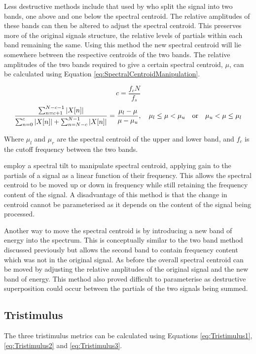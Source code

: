 		Less destructive methods include that used by \citet{zacharakis2011an} who split the signal into two bands,
		one above and one below the spectral centroid. The relative amplitudes of these bands can then be altered to
		adjust the spectral centroid. This preserves more of the original signals structure, the relative levels of
		partials within each band remaining the same. Using this method the new spectral centroid will lie somewhere
		between the respective centroids of the two bands. The relative amplitudes of the two bands required to give
		a certain spectral centroid, $\mu$, can be calculated using Equation \ref{eq:SpectralCentroidManipulation}.

		\[ c = \frac{f_{c}N}{f_{s}}\]
		\begin{equation}
			\frac{\sum_{n = c + 1}^{N-c-1} \left|X[n]\right|}
			     {\sum_{n = 0}^{c} \left|X[n]\right| + \sum_{n = N-c}^{N-1}\left|X[n]\right|} = 
			\frac{\mu_{l} - \mu}{\mu - \mu_{u}}, 
			\quad \mu_{l} \leq \mu < \mu_{u} \quad \textrm{or} \quad \mu_{u} < \mu \leq \mu_{l}
			\label{eq:SpectralCentroidManipulation}
		\end{equation}

		Where $\mu_{l}$ and $\mu_{r}$ are the spectral centroid of the upper and lower band, and $f_{c}$ is the
		cutoff frequency between the two bands.

		\citet{williams2007perceptually} employ a spectral tilt to manipulate spectral centroid, applying gain to
		the partials of a signal as a linear function of their frequency. This allows the spectral centroid to be
		moved up or down in frequency while still retaining the frequency content of the signal. A disadvantage of
		this method is that the change in centroid cannot be parameterised as it depends on the content of the
		signal being processed.

		Another way to move the spectral centroid is by introducing a new band of energy into the spectrum. This is
		conceptually similar to the two band method discussed previously but allows the second band to contain
		frequency content which was not in the original signal. As before the overall spectral centroid can be moved
		by adjusting the relative amplitudes of the original signal and the new band of energy. This method also
		proved difficult to parameterise as destructive superposition could occur between the partials of the two
		signals being summed.

	\subsection{Tristimulus}
	\label{sec:FeatureControl-Parameterisation-Tristimulus}
		The three tristimulus metrics can be calculated using Equations \ref{eq:Tristimulus1}, \ref{eq:Tristimulus2}
		and \ref{eq:Tristimulus3}.
		
